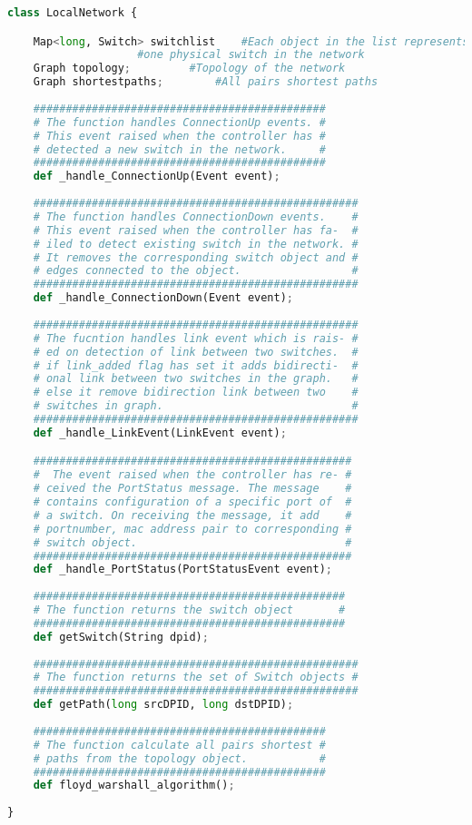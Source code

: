 \documentclass[10pt,a4paper,titlepage]{report}
\begin{document}
\begin{lstlisting}[language=Python]
class LocalNetwork {

	Map<long, Switch> switchlist 	#Each object in the list represents 
					#one physical switch in the network
	Graph topology;			#Topology of the network
	Graph shortestpaths;		#All pairs shortest paths
	
	#############################################
	# The function handles ConnectionUp events. #
	# This event raised when the controller has #
	# detected a new switch in the network.     #
	#############################################
	def _handle_ConnectionUp(Event event);
	
	##################################################
	# The function handles ConnectionDown events.	 #
	# This event raised when the controller has fa-	 #
	# iled to detect existing switch in the network. #
	# It removes the corresponding switch object and #
	# edges connected to the object.                 #
	##################################################
	def _handle_ConnectionDown(Event event);
	
	##################################################
	# The fucntion handles link event which is rais- # 
	# ed on detection of link between two switches.  #
	# if link_added flag has set it adds bidirecti-  #
	# onal link between two switches in the graph.   #
	# else it remove bidirection link between two	 #
	# switches in graph.                             #
	##################################################
	def _handle_LinkEvent(LinkEvent event);

	#################################################
	#  The event raised when the controller has re- #
	# ceived the PortStatus message. The message    #
	# contains configuration of a specific port of  #
	# a switch. On receiving the message, it add    #
	# portnumber, mac address pair to corresponding #
	# switch object.                                #
	#################################################
	def _handle_PortStatus(PortStatusEvent event);
	
	################################################
	# The function returns the switch object       #
	################################################
	def getSwitch(String dpid);
	
	##################################################
	# The function returns the set of Switch objects #
	##################################################
	def getPath(long srcDPID, long dstDPID);
	
	#############################################
	# The function calculate all pairs shortest #
	# paths from the topology object.           #
	#############################################
	def floyd_warshall_algorithm();
	
}
	\end{lstlisting}
	
\end{document}

